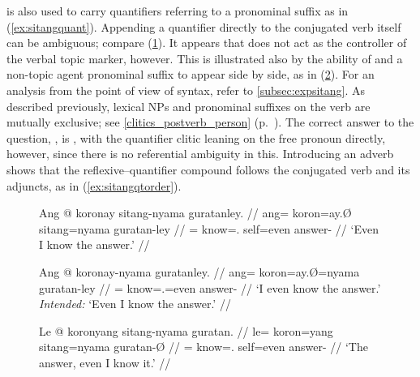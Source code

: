  is also used to carry quantifiers referring to a
pronominal suffix as in (\ref{ex:sitangquant}). Appending a quantifier directly
to the conjugated verb itself can be ambiguous; compare
(\ref{ex:nositangquant}). It appears that  does not act as
the controller of the verbal topic marker, however. This is illustrated also by
the ability of  and a non-topic agent pronominal suffix to
appear side by side, as in (\ref{ex:sitangnotop}). For an analysis from the
point of view of syntax, refer to \autoref{subsec:expsitang}. As described
previously, lexical NPs and pronominal suffixes on the verb are mutually
exclusive; see \autoref{clitics_postverb_person}
(p.~\pageref{clitics_postverb_person}). The correct answer to the question,
, is , with the quantifier clitic
leaning on the free pronoun directly, however, since there is no referential
ambiguity in this. Introducing an adverb shows that the reflexive--quantifier
compound follows the conjugated verb and its adjuncts, as in
(\ref{ex:sitangqtorder}).

\begin{figure}
\pex
\a\label{ex:sitangquant}\begingl
	\gla Ang @ koronay sitang-nyama guratanley. //
	\glb ang= koron=ay.Ø sitang=nyama guratan-ley //
	\glc \AgtT{}= know=\Fsg{}.\Top{} self=even answer-\PargI{} //
	\glft `Even I know the answer.' //
\endgl

\a\label{ex:nositangquant}\ljudge\excl\begingl
	\gla Ang @ koronay-nyama guratanley. //
	\glb ang= koron=ay.Ø=nyama guratan-ley //
	\glc \AgtT{}= know=\Fsg{}.\Top{}=even answer-\PargI{} //
	\glft `I even know the answer.' \\
		\textit{Intended:} `Even I know the answer.' //
\endgl
\xe
\end{figure}

\begin{figure}
\ex\label{ex:sitangnotop}%
\begingl
	\gla Le @ koronyang sitang-nyama guratan. //
	\glb le= koron=yang sitang=nyama guratan-Ø //
	\glc \PatTI{}= know=\Fsg{}.\Aarg{} self=even answer-\Top{} //
	\glft `The answer, even I know it.' //
\endgl\xe
\end{figure}

